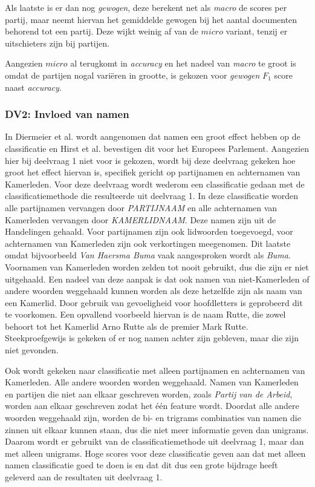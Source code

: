 Als laatste is er dan nog \textit{gewogen}, deze berekent net als \textit{macro} de scores per partij, maar neemt hiervan het gemiddelde gewogen bij het aantal documenten behorend tot een partij. Deze wijkt weinig af van de $micro$ variant, tenzij er uitschieters zijn bij partijen.\par
Aangezien $micro$ al terugkomt in \textit{accuracy} en het nadeel van \textit{macro} te groot is omdat de partijen nogal variëren in grootte, is gekozen voor \textit{gewogen} $F_1$ score naast \textit{accuracy}.
\bigskip

\subsubsection{DV2: Invloed van namen}
In Diermeier et al. \cite{diermeier_godbout_yu_kaufmann_2012} wordt aangenomen dat namen een groot effect hebben op de classificatie en Hirst et al. \cite{Hirst_textto} bevestigen dit voor het Europees Parlement. Aangezien hier bij deelvraag 1 niet voor is gekozen, wordt bij deze deelvraag gekeken hoe groot het effect hiervan is, specifiek gericht op partijnamen en achternamen van Kamerleden. Voor deze deelvraag wordt wederom een classificatie gedaan met de classificatiemethode die resulteerde uit deelvraag 1. In deze classificatie worden alle partijnamen vervangen door \textit{PARTIJNAAM} en alle achternamen van Kamerleden vervangen door \textit{KAMERLIDNAAM}. Deze namen zijn uit de Handelingen gehaald. Voor partijnamen zijn ook lidwoorden toegevoegd, voor achternamen van Kamerleden zijn ook verkortingen meegenomen. Dit laatste omdat bijvoorbeeld \textit{Van Haersma Buma} vaak aangesproken wordt als \textit{Buma}. Voornamen van Kamerleden worden zelden tot nooit gebruikt, dus die zijn er niet uitgehaald. Een nadeel van deze aanpak is dat ook namen van niet-Kamerleden of andere woorden weggehaald kunnen worden als deze hetzelfde zijn als naam van een Kamerlid. Door gebruik van gevoeligheid voor hoofdletters is geprobeerd dit te voorkomen. Een opvallend voorbeeld hiervan is de naam Rutte, die zowel behoort tot het Kamerlid Arno Rutte als de premier Mark Rutte. Steekproefgewijs is gekeken of er nog namen achter zijn gebleven, maar die zijn niet gevonden. \par
Ook wordt gekeken naar classificatie met alleen partijnamen en achternamen van Kamerleden. Alle andere woorden worden weggehaald. Namen van Kamerleden en partijen die niet aan elkaar geschreven worden, zoals \textit{Partij van de Arbeid}, worden aan elkaar geschreven zodat het één feature wordt. Doordat alle andere woorden weggehaald zijn, worden de bi- en trigrams combinaties van namen die zinnen uit elkaar kunnen staan, dus die niet meer informatie geven dan unigrams. Daarom wordt er gebruikt van de classificatiemethode uit deelvraag 1, maar dan met alleen unigrams. Hoge scores voor deze classificatie geven aan dat met alleen namen classificatie goed te doen is en dat dit dus een grote bijdrage heeft geleverd aan de resultaten uit deelvraag 1. \par

